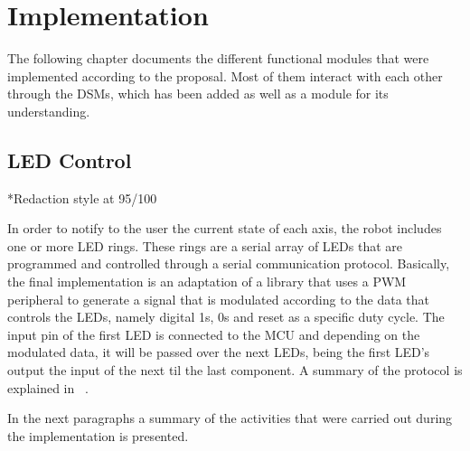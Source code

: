 \chapter{Implementation}\label{cha:implementation}
The following chapter documents the different functional modules that were implemented according to the proposal. 
Most of them interact with each other through the DSMs, which has been added as well as a module for its 
understanding.

\section{LED Control}\label{sec:leds}
*Redaction style at 95/100

In order to notify to the user the current state of each axis, the robot includes one or more LED rings. These rings are 
 a serial array of LEDs that are programmed and controlled through a serial communication protocol. Basically, the final implementation
 is an adaptation of a library that uses a PWM peripheral to generate a signal that is modulated according to the data that 
 controls the LEDs, namely digital 1s, 0s and reset as a specific duty cycle. The input pin of the first LED is connected to the MCU and depending on the modulated data, it will be 
 passed over the next LEDs, being the first LED's output the input of the next til the last component. A summary of the 
 protocol is explained in ~\cite{led_protocol}. 

 In the next paragraphs a summary of the activities that were carried out during the implementation is presented.

